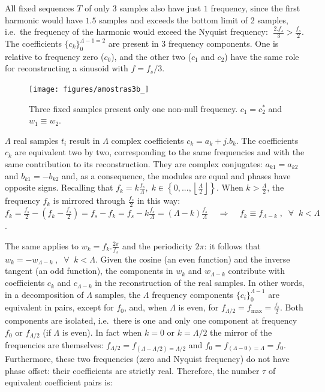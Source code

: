 All fixed sequences $T$ of only $3$ samples also have just $1$ frequency, since the first harmonic would have $1.5$ samples and exceeds the bottom limit of 2 samples, i.e.\ the frequency of the harmonic would exceed the Nyquist frequency:  $\; \frac{2. f_s}{3} > \frac{f_s}{2}$. 
The coefficients $\{c_k\}_0^{\Lambda-1=2}$ are present in 3 frequency components. One is relative to frequency zero ($c_0$), and the other two ($c_1$ and $c_2$) have the same role for reconstructing a sinusoid with $f=f_s/3$.

 \begin{figure}
     \centering
         \texttt{[image: figures/amostras3b\_]}
     \caption{Three fixed samples present only one non-null frequency. $c_1=c_2^*$ and $w_1 \equiv w_2$.}
         \label{fig:amostras3}
 \end{figure}

$\Lambda$ real samples $t_i$ result in $\Lambda$ complex coefficients $c_k=a_k+j.b_k$. The coefficients $c_k$ are equivalent two by two, corresponding to the same frequencies and with the same contribution to its reconstruction. They are complex conjugates: $a_{k1}=a_{k2}$ and $b_{k1}=-b_{k2}$ and, as a consequence, the modules are equal and phases have opposite signs. Recalling that $f_k = k\frac{f_s}{\Lambda}, \; k \in \left\{0, ..., \left \lfloor \frac{\Lambda}{2} \right \rfloor \right\} $. When $k > \frac{\Lambda}{2}$, the frequency $f_k$ is mirrored through $\frac{f_s}{2}$ in this way: $f_k=\frac{f_s}{2} - (f_k-\frac{f_s}{2})=f_s-f_k=f_s - k\frac{f_s}{\Lambda}=(\Lambda-k)\frac{f_s}{\Lambda} \;\;\;\; \Rightarrow \;\;\;\; f_k\equiv f_{\Lambda-k} \; ,\;\; \forall \;\; k<\Lambda$. 

The same applies to $w_k=f_k.\frac{2\pi}{f_s}$ and the periodicity $2\pi$: it follows that $w_k=-w_{\Lambda-k} \; ,\;\; \forall \;\; k<\Lambda$. Given the cosine (an even function) and the inverse tangent (an odd function), the components in $w_k$ and $w_{\Lambda-k}$ contribute with coefficients $c_k$ and $c_{\Lambda-k}$ in the reconstruction of the real samples. In other words, in a decomposition of $\Lambda$ samples, the $\Lambda$ frequency components $\{c_i\}_0^{\Lambda-1}$ are equivalent in pairs,
except for $f_0$, and, when $\Lambda$ is even, for $f_{\Lambda/2}=f_{\text{max}}=\frac{f_s}{2}$. Both components are isolated, i.e.\ there is one and only one component at frequency $f_0$ or $f_{\Lambda/2}$ (if $\Lambda$ is even). In fact when $k=0$ or $k=\Lambda/2$ the mirror of the frequencies are themselves: $f_{\Lambda/2}=f_{(\Lambda-\Lambda/2) = \Lambda/2}$ and $f_0=f_{(\Lambda-0)=\Lambda}=f_0$.
Furthermore, these two frequencies (zero and Nyquist frequency) do not have phase offset: their coefficients are strictly real. Therefore, the number $\tau$ of equivalent coefficient pairs is:

